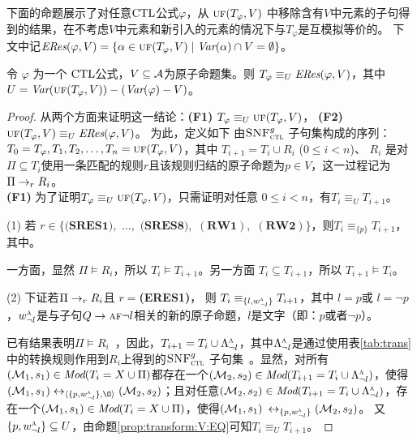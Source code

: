 下面的命题展示了对任意$\textrm{CTL}$公式$\varphi$，从 $\textsc{uf}(T_\varphi,V)$ 中移除含有$V$中元素的子句得到的结果，在不考虑$V$中元素和新引入的元素的情况下与$T_\varphi$是互模拟等价的。
下文中记$\emph{ERes}(\varphi,V) = \{\alpha\in \textsc{uf}(T_\varphi,V)\mid \textit{Var}(\alpha)\cap V=\emptyset\}$。
\begin{proposition}\label{pro:resEQ}
	令 $\varphi$ 为一个 $\textrm{CTL}$公式，$V\subseteq\cal A$为原子命题集。则
	$T_\varphi \equiv_U\emph{ERes}(\varphi,V)$，其中  $U=\textit{Var}(\textsc{uf}(T_\varphi,V))-(\textit{Var}(\varphi)-  V)$。
\end{proposition}
\begin{proof}
	从两个方面来证明这一结论：\textbf{(F1)} $T_\varphi \equiv_U \textsc{uf}(T_\varphi,V)$， \textbf{(F2)} $\textsc{uf}(T_\varphi,V) \equiv_{U} \emph{ERes}(\varphi,V)$。
	为此，定义如下 由${\textsc{SNF}_{\textsc{ctl}}^g}$ 子句集构成的序列： $T_0=T_{\varphi}, T_1, T_2, \dots, T_n = \textsc{uf}(T_\varphi,V)$，其中
	$T_{i+1} = T_i \cup R_i$ ($0\leq i < n$)、 $R_i$ 是对$\Pi \subseteq T_i$使用一条匹配的规则$r$且该规则归结的原子命题为$p\in V$，这一过程记为 $\Pi \rightarrow_r R_i$。
	\\
	
	\textbf{(F1)} 为了证明$T_\varphi \equiv_U \textsc{uf}(T_\varphi,V)$，只需证明对任意 $0\leq i < n$，有$T_i \equiv_{U} T_{i+1}$。
	
	
	
	(1) 若 $r\in \{\textbf{(SRES1)},$ $\dots,$ $\textbf{(SRES8)},$ $(\textbf{RW1}),$ $(\textbf{RW2})\}$，则$T_i \equiv_{\{p\}} T_{i+1}$，其中。
	
	
	一方面，显然 $\Pi \models R_i$，所以 $T_i \models T_{i+1}$。另一方面 $T_i\subseteq T_{i+1}$，所以 $T_{i+1} \models T_i$。
	
	(2) 下证若$\Pi \rightarrow_r R_i$且 $r=$\textbf{(ERES1)}，
	则 $T_i \equiv_{\{l, w_{\neg l}^{\textsc{a}}\}} T_{i+1}$，其中 $l = p$或 $l = \neg p$，$w_{\neg l}^{\textsc{a}}$是与子句$Q \rightarrow \textsc{a} \textsc{f} \neg l$相关的新的原子命题，$l$是文字（即：$p$或者$\neg p$）。
	
	已有结果表明$\Pi \models R_i$~\cite{bolotov2000clausal}，因此，$T_{i+1}=T_i \cup \Lambda_{\neg l}^{\textsc{a}}$，其中$\Lambda_{\neg l}^{\textsc{a}}$是通过使用表\ref{tab:trans}中的转换规则作用到$R_i$上得到的${\textsc{SNF}_{\textsc{ctl}}^g}$ 子句集~\cite{zhang2009refined}。显然，对所有$({\cal M}_1,s_1) \in \textit{Mod}(T_i= X \cup \Pi)$都存在一个$({\cal M}_2, s_2)\in \textit{Mod}(T_{i+1}=T_i \cup \Lambda_{\neg l}^{\textsc{a}})$，使得$(\Hm_1, s_1) \lrto_{\tuple{\{p, w_{\neg l}^{\ALL}\}, {\O}}} (\Hm_2, s_2)$；且对任意$({\cal M}_2, s_2)\in \textit{Mod}(T_{i+1}=T_i \cup \Lambda_{\neg l}^{\textsc{a}})$，存在一个$({\cal M}_1,s_1) \in \textit{Mod}(T_i= X \cup \Pi)$，使得$({\cal M}_1, s_1) $ $\leftrightarrow_{\{p, w_{\neg l}^{\textsc{a}}\}} ({\cal M}_2, s_2)$。
	又$\{p, w_{\neg l}^{\textsc{a}}\} \subseteq U$，由命题\ref{prop:transform:V:EQ}可知$T_i \equiv_{U} T_{i+1}$。
	

\end{proof}
